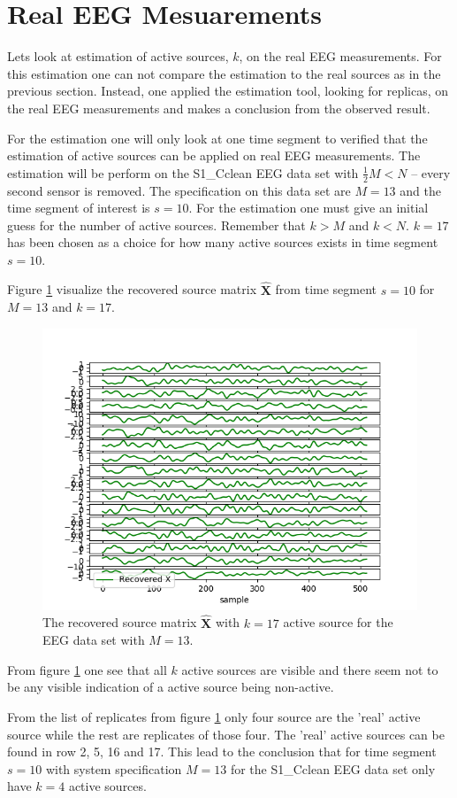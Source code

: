 \section{Real EEG Mesuarements}
Lets look at estimation of active sources, $k$, on the real EEG measurements. 
For this estimation one can not compare the estimation to the real sources as in the previous section.
Instead, one applied the estimation tool, looking for replicas, on the real EEG measurements and makes a conclusion from the observed result.

For the estimation one will only look at one time segment to verified that the estimation of active sources can be applied on real EEG measurements. The estimation will be perform on the S1\_Cclean EEG data set with $\frac{1}{2} M < N$ -- every second sensor is removed. The specification on this data set are $M=13$ and the time segment of interest is $s = 10$. 
For the estimation one must give an initial guess for the number of active sources. Remember that $k>M$ and $k<N$.  
$k = 17$ has been chosen as a choice for how many active sources exists in time segment $s = 10$. 

Figure \ref{fig:eeg_k} visualize the recovered source matrix $\hat{\mathbf{X}}$ from time segment $s=10$ for $M=13$ and $k = 17$.
\begin{figure}[H]
    \centering
	\includegraphics[scale=0.5]{figures/ch_estimate/eeg_k_timeseg_10.png}
	\caption{The recovered source matrix $\hat{\mathbf{X}}$ with $k=17$ active source for the EEG data set with $M=13$.}
	\label{fig:eeg_k}
\end{figure}
\noindent
From figure \ref{fig:eeg_k} one see that all $k$ active sources are visible and there seem not to be any visible indication of a active source being non-active. 

From the list of replicates from figure \ref{fig:eeg_k} only four source are the 'real' active source while the rest are replicates of those four. The 'real' active sources can be found in row 2, 5, 16 and 17. This lead to the conclusion that for time segment $s=10$ with system specification $M=13$ for the  S1\_Cclean EEG data set only have $k=4$ active sources.



